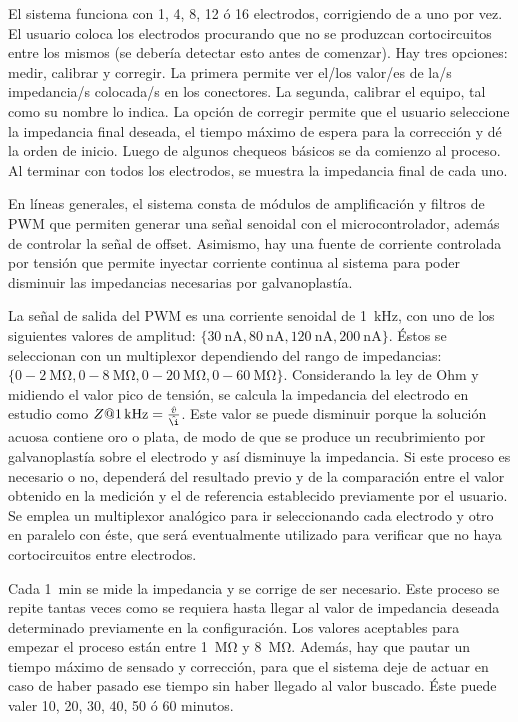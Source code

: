 El sistema funciona con 1, 4, 8, 12 ó 16 electrodos, corrigiendo de a uno por vez. El usuario coloca los electrodos procurando que no se produzcan cortocircuitos entre los mismos (se debería detectar esto antes de comenzar). Hay tres opciones: medir, calibrar y corregir. La primera permite ver el/los valor/es de la/s impedancia/s colocada/s en los conectores. La segunda, calibrar el equipo, tal como su nombre lo indica. La opción de corregir permite que el usuario seleccione la impedancia final deseada, el tiempo máximo de espera para la corrección y dé la orden de inicio. Luego de algunos chequeos básicos se da comienzo al proceso. Al terminar con todos los electrodos, se muestra la impedancia final de cada uno. 

En líneas generales, el sistema consta de módulos de amplificación y filtros de PWM que permiten generar una señal senoidal con el microcontrolador, además de controlar la señal de offset. Asimismo, hay una fuente de corriente controlada por tensión que permite inyectar corriente continua al sistema para poder disminuir las impedancias necesarias por galvanoplastía. 

La señal de salida del PWM es una corriente senoidal de \SI{1}{\kilo\hertz}, con uno de los siguientes valores de amplitud: $\{\SI{30}{\nano\ampere}, \SI{80}{\nano\ampere}, \SI{120}{\nano\ampere}, \SI{200}{\nano\ampere}\}$. Éstos se seleccionan con un multiplexor dependiendo del rango de impedancias: $\{0-\SI{2}{\mega\ohm}, 0-\SI{8}{\mega\ohm}, 0-\SI{20}{\mega\ohm}, 0-\SI{60}{\mega\ohm}\}$. Considerando la ley de Ohm y midiendo el valor pico de tensión, se calcula la impedancia del electrodo en estudio como $Z@\SI{1}{\kilo\hertz} = \frac{\hat{v}}{\hat{\i}}$. Este valor se puede disminuir porque la solución acuosa contiene oro o plata, de modo de que se produce un recubrimiento por galvanoplastía sobre el electrodo y así disminuye la impedancia. Si este proceso es necesario o no, dependerá del resultado previo y de la comparación entre el valor obtenido en la medición y el de referencia establecido previamente por el usuario. Se emplea un multiplexor analógico para ir seleccionando cada electrodo y otro en paralelo con éste, que será eventualmente utilizado para verificar que no haya cortocircuitos entre electrodos. 

Cada \SI{1}{\minute} se mide la impedancia y se corrige de ser necesario. Este proceso se repite tantas veces como se requiera hasta llegar al valor de impedancia deseada determinado previamente en la configuración. Los valores aceptables para empezar el proceso están entre \SI{1}{\mega\ohm} y \SI{8}{\mega\ohm}. Además, hay que pautar un tiempo máximo de sensado y corrección, para que el sistema deje de actuar en caso de haber pasado ese tiempo sin haber llegado al valor buscado. Éste puede valer 10, 20, 30, 40, 50 ó 60 minutos.

